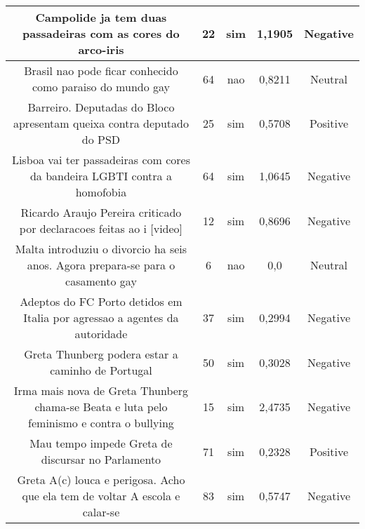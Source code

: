 \documentclass[11pt]{article}
\newlength\mylength
\begin{document}
\begin{center}
\begin{longtable}{||C{.40\mylength}||C{.20\mylength}||C{.20\mylength}||C{.30\mylength}||C{.20\mylength}||}
   Campolide ja tem duas passadeiras com as cores do arco-iris  & 22 & sim & 1,1905 & Negative \\  \hline
   Brasil nao pode ficar conhecido como paraiso do mundo gay  & 64 & nao & 0,8211 & Neutral \\  \hline
   Barreiro. Deputadas do Bloco apresentam queixa contra deputado do PSD  & 25 & sim & 0,5708 & Positive \\  \hline
   Lisboa vai ter passadeiras com cores da bandeira LGBTI contra a homofobia  & 64 & sim & 1,0645 & Negative \\  \hline
   Ricardo Araujo Pereira criticado por declaracoes feitas ao i [video]  & 12 & sim & 0,8696 & Negative \\  \hline
   Malta introduziu o divorcio ha seis anos. Agora prepara-se para o casamento gay  & 6 & nao & 0,0 & Neutral \\  \hline
   Adeptos do FC Porto detidos em Italia por agressao a agentes da autoridade  & 37 & sim & 0,2994 & Negative \\  \hline
   Greta Thunberg podera estar a caminho de Portugal  & 50 & sim & 0,3028 & Negative \\  \hline
   Irma mais nova de Greta Thunberg chama-se Beata e luta pelo feminismo e contra o bullying  & 15 & sim & 2,4735 & Negative \\  \hline
   Mau tempo impede Greta de discursar no Parlamento  & 71 & sim & 0,2328 & Positive \\  \hline
   Greta A(c) louca e perigosa. Acho que ela tem de voltar A  escola e calar-se  & 83 & sim & 0,5747 & Negative \\  \hline

\end{longtable}
\end{center}
\end{document}
